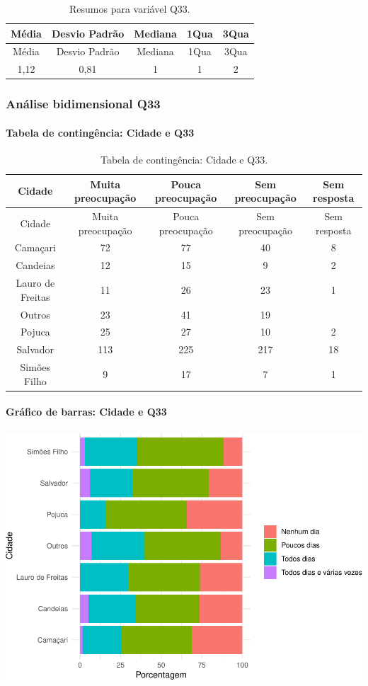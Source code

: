 \documentclass[]{article}
\let\oldparagraph\paragraph
\renewcommand{\paragraph}[1]{\oldparagraph{#1}\mbox{}}
\begin{document}
\begin{longtable}[]{@{}ccccc@{}}
\caption{\label{tab:unnamed-chunk-1132}Resumos para variável Q33.}\tabularnewline
\toprule
Média & Desvio Padrão & Mediana & 1Qua & 3Qua\tabularnewline
\midrule
\endfirsthead
\toprule
Média & Desvio Padrão & Mediana & 1Qua & 3Qua\tabularnewline
\midrule
\endhead
1,12 & 0,81 & 1 & 1 & 2\tabularnewline
\bottomrule
\end{longtable}

\cleardoublepage

\hypertarget{anuxe1lise-bidimensional-q33}{%
\subsubsection{Análise bidimensional Q33}\label{anuxe1lise-bidimensional-q33}}

\hypertarget{tabela-de-continguxeancia-cidade-e-q33}{%
\paragraph{Tabela de contingência: Cidade e Q33}\label{tabela-de-continguxeancia-cidade-e-q33}}

\begin{longtable}[]{@{}ccccc@{}}
\caption{\label{tab:unnamed-chunk-1133}Tabela de contingência: Cidade e Q33.}\tabularnewline
\toprule
Cidade & Muita preocupação & Pouca preocupação & Sem preocupação & Sem resposta\tabularnewline
\midrule
\endfirsthead
\toprule
Cidade & Muita preocupação & Pouca preocupação & Sem preocupação & Sem resposta\tabularnewline
\midrule
\endhead
Camaçari & 72 & 77 & 40 & 8\tabularnewline
Candeias & 12 & 15 & 9 & 2\tabularnewline
Lauro de Freitas & 11 & 26 & 23 & 1\tabularnewline
Outros & 23 & 41 & 19 &\tabularnewline
Pojuca & 25 & 27 & 10 & 2\tabularnewline
Salvador & 113 & 225 & 217 & 18\tabularnewline
Simões Filho & 9 & 17 & 7 & 1\tabularnewline
\bottomrule
\end{longtable}

\hypertarget{gruxe1fico-de-barras-cidade-e-q33}{%
\paragraph{Gráfico de barras: Cidade e Q33}\label{gruxe1fico-de-barras-cidade-e-q33}}

\begin{center}\includegraphics[width=0.75\linewidth]{relatorio_covid19_files/figure-latex/unnamed-chunk-1134-1} \end{center}
\end{document}
